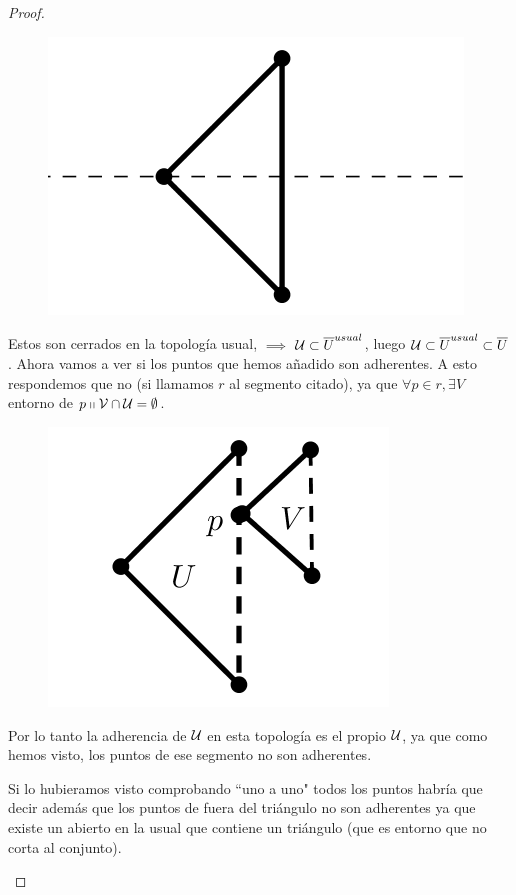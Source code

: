 \begin{proof}
\begin{enumerate}
		\begin{figure}[h!]
			\centering
			\includegraphics[scale = 1.5]{img/ExamenSeptiembre2017/Abiertosadherencia1img}
		\end{figure}
	
		Estos son cerrados en la topología usual, $\implies$ $\mathcal{U} \subset \overline{U}^{usual}$, luego  $\mathcal{U} \subset \overline{U}^{usual} \subset \overline{U}$.
		Ahora vamos a ver si los puntos que hemos añadido son adherentes. A esto respondemos que no (si llamamos $r$ al segmento citado), ya que $\forall p \in r , \exists V$ entorno de $p \shortparallel \mathcal{V} \cap \mathcal{U} = \emptyset$.
		
		\begin{figure}[h!]
			\centering
			\includegraphics[scale = 1.5]{img/ExamenSeptiembre2017/Abiertosadherencia2img}
		\end{figure}
		
		Por lo tanto la adherencia de $\mathcal{U}$ en esta topología es el propio $\mathcal{U}$, ya que como hemos visto, los puntos de ese segmento no son adherentes.
		
		Si lo hubieramos visto comprobando ``uno a uno" todos los puntos habría que decir además que los puntos de fuera del triángulo no son adherentes ya que existe un abierto en la usual que contiene un triángulo (que es entorno que no corta al conjunto).
		

\end{enumerate}
\end{proof}
